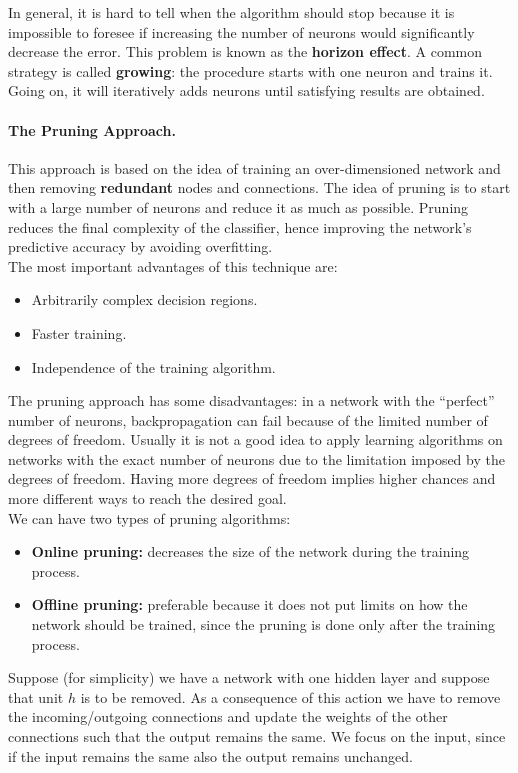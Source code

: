 In general, it is hard to tell when the algorithm should stop because it is impossible to foresee if increasing the number of neurons would significantly decrease the error. This problem is known as the \textbf{horizon effect}. A common strategy is called \textbf{growing}: the procedure starts with one neuron and trains it. Going on, it will iteratively adds neurons until satisfying results are obtained.

\paragraph*{The Pruning Approach.} This approach is based on the idea of training an over-dimensioned network and then removing \textbf{redundant} nodes and connections. The idea of pruning is to start with a large number of neurons and reduce it as much as possible. Pruning reduces the final complexity of the classifier, hence improving the network's predictive accuracy by avoiding overfitting.\\
The most important advantages of this technique are:
\begin{itemize}
	\item Arbitrarily complex decision regions.
	\item Faster training.
	\item Independence of the training algorithm.
\end{itemize}

The pruning approach has some disadvantages: in a network with the ``perfect'' number of neurons, backpropagation can fail because of the limited number of degrees of freedom. Usually it is not a good idea to apply learning algorithms on networks with the exact number of neurons due to the limitation imposed by the degrees of freedom. Having more degrees of freedom implies higher chances and more different ways to reach the desired goal.\\
We can have two types of pruning algorithms:
\begin{itemize}
	\item \textbf{Online pruning:} decreases the size of the network during the training process.
	\item \textbf{Offline pruning:} preferable because it does not put limits on how the network should be trained, since the pruning is done only after the training process. 
\end{itemize}
Suppose (for simplicity) we have a network with one hidden layer and suppose that unit $h$ is to be removed. 
As a consequence of this action we have to remove the incoming/outgoing connections and update the weights of the other connections such that the output remains the same. We focus on the input, since if the input remains the same also the output remains unchanged.

